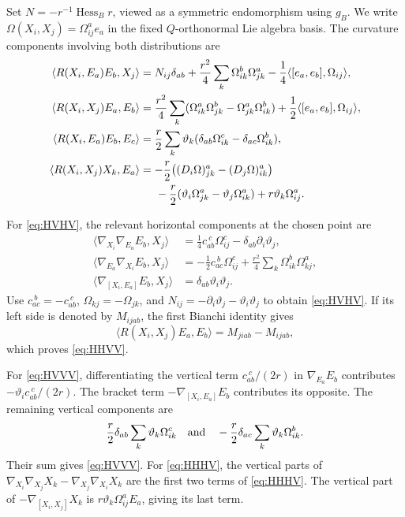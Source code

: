 \documentclass[12pt]{amsart}
\numberwithin{equation}{section}
\theoremstyle{remark}
\newcommand{\Hess}{\operatorname{Hess}}
\begin{document}
Set \(N=-r^{-1}\Hess_Br\), viewed as a symmetric endomorphism using
\(g_B\). We write
\(\Omega(X_i,X_j)=\Omega_{ij}^a e_a\) in the fixed
\(Q\)-orthonormal Lie algebra basis. The curvature components
involving both distributions are
\begin{align}
\langle R(X_i,E_a)E_b,X_j\rangle
 &=N_{ij}\delta_{ab}
   +\frac{r^2}{4}\sum_k\Omega_{ik}^b\Omega_{jk}^a
   -\frac14\langle[e_a,e_b],\Omega_{ij}\rangle,
\label{eq:HVHV}\\
\langle R(X_i,X_j)E_a,E_b\rangle
 &=\frac{r^2}{4}\sum_k
       (\Omega_{ik}^a\Omega_{jk}^b-\Omega_{jk}^a\Omega_{ik}^b)
   +\frac12\langle[e_a,e_b],\Omega_{ij}\rangle,
\label{eq:HHVV}\\
\langle R(X_i,E_a)E_b,E_c\rangle
 &=\frac r2\sum_k \vartheta_k
       (\delta_{ab}\Omega_{ik}^c-\delta_{ac}\Omega_{ik}^b),
\label{eq:HVVV}\\
\langle R(X_i,X_j)X_k,E_a\rangle
 &=-\frac r2\bigl((D_i\Omega)_{jk}^a-(D_j\Omega)_{ik}^a\bigr)
       \notag\\
 &\hspace{5mm}-\frac r2(\vartheta_i\Omega_{jk}^a-\vartheta_j\Omega_{ik}^a)
       +r\vartheta_k\Omega_{ij}^a.
\label{eq:HHHV}
\end{align}

For \eqref{eq:HVHV}, the relevant horizontal components at the
chosen point are
\begin{align*}
\langle\nabla_{X_i}\nabla_{E_a}E_b,X_j\rangle
  &=\tfrac14c_{ab}^{\ c}\Omega_{ij}^c
       -\delta_{ab}\partial_i\vartheta_j,\\
\langle\nabla_{E_a}\nabla_{X_i}E_b,X_j\rangle
  &=-\tfrac12c_{ac}^{\ b}\Omega_{ij}^c
       +\tfrac{r^2}{4}\sum_k\Omega_{ik}^b\Omega_{kj}^a,\\
\langle\nabla_{[X_i,E_a]}E_b,X_j\rangle
  &=\delta_{ab}\vartheta_i\vartheta_j.
\end{align*}
Use \(c_{ac}^{\ b}=-c_{ab}^{\ c}\),
\(\Omega_{kj}=-\Omega_{jk}\), and
\(N_{ij}=-\partial_i\vartheta_j-\vartheta_i\vartheta_j\) to obtain
\eqref{eq:HVHV}. If its left side is denoted by \(M_{ijab}\),
the first Bianchi identity gives
\[
\langle R(X_i,X_j)E_a,E_b\rangle=M_{jiab}-M_{ijab},
\]
which proves \eqref{eq:HHVV}.

For \eqref{eq:HVVV}, differentiating the vertical term
\(c_{ab}^{\ c}/(2r)\) in \(\nabla_{E_a}E_b\) contributes
\(-\vartheta_i c_{ab}^{\ c}/(2r)\). The bracket term
\(-\nabla_{[X_i,E_a]}E_b\) contributes its opposite. The remaining
vertical components are
\[
\frac r2\delta_{ab}\sum_k \vartheta_k\Omega_{ik}^c
 \quad\hbox{and}\quad
-\frac r2\delta_{ac}\sum_k \vartheta_k\Omega_{ik}^b.
\]
Their sum gives \eqref{eq:HVVV}. For \eqref{eq:HHHV}, the vertical parts of
\(\nabla_{X_i}\nabla_{X_j}X_k-\nabla_{X_j}\nabla_{X_i}X_k\)
are the first two terms of \eqref{eq:HHHV}. The vertical part of
\(-\nabla_{[X_i,X_j]}X_k\) is \(r\vartheta_k\Omega_{ij}^aE_a\),
giving its last term.
\end{document}
